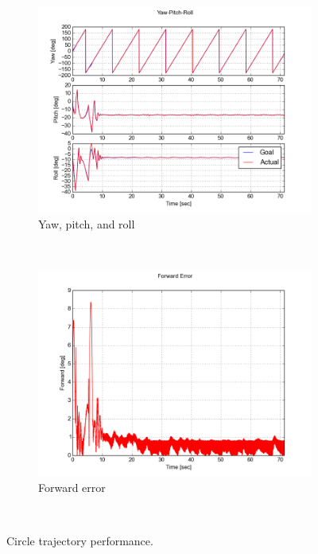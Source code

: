 \documentclass[paper=letter, fontsize=11pt]{scrartcl} %
\numberwithin{equation}{section} %
\numberwithin{figure}{section} %
\numberwithin{table}{section} %
\begin{document}
\begin{figure}[h]
  \begin{subfigure}[b]{0.45\textwidth}
    \includegraphics[width=\textwidth]{circle_yaw_pitch_roll}
    \caption{Yaw, pitch, and roll}
    \label{fig:circle_yaw_pitch_roll}
  \end{subfigure}%
  ~ %
  \begin{subfigure}[b]{0.45\textwidth}
    \includegraphics[width=\textwidth]{circle_fwd_error}
    \caption{Forward error}
    \label{fig:circle_fwd_error}
  \end{subfigure}
  ~ %
  \caption{Circle trajectory performance.}
  \label{fig:circle_performance}
\end{figure}
\end{document}
